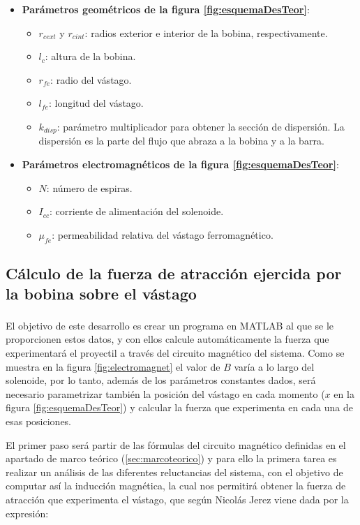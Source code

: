\begin{itemize}
    \item \textbf{Parámetros geométricos de la figura \ref{fig:esquemaDesTeor}}:
    \begin{itemize}
        \item \(r_{cext}\) y \(r_{cint} \): radios exterior e interior de la bobina, respectivamente.
        \item \(l_c\): altura de la bobina.
        \item \(r_{fe}\): radio del vástago.
        \item \(l_{fe}\): longitud del vástago.
        \item \(k_{disp}\): parámetro multiplicador para obtener la sección de dispersión. La dispersión es la parte del flujo que abraza a la bobina y a la barra.
    \end{itemize}
    \item \textbf{Parámetros electromagnéticos de la figura \ref{fig:esquemaDesTeor}}:
    \begin{itemize}
        \item \(N\): número de espiras.
        \item \(I_{cc}\): corriente de alimentación del solenoide.
        \item \(\mu_{fe}\): permeabilidad relativa del vástago ferromagnético.
    \end{itemize}
\end{itemize}

\subsection{Cálculo de la fuerza de atracción ejercida por la bobina sobre el vástago}

El objetivo de este desarrollo es crear un programa en MATLAB\textsuperscript{\textregistered} al que se le proporcionen estos datos, y con ellos calcule automáticamente la fuerza que experimentará el proyectil a través del circuito magnético del sistema. Como se muestra en la figura \ref{fig:electromagnet} el valor de \(B\) varía a lo largo del solenoide, por lo tanto, además de los parámetros constantes dados, será necesario parametrizar también la posición del vástago en cada momento (\(x\) en la figura \ref{fig:esquemaDesTeor}) y calcular la fuerza que experimenta en cada una de esas posiciones.

El primer paso será partir de las fórmulas del circuito magnético definidas en el apartado de marco teórico (\ref{sec:marcoteorico}) y para ello la primera tarea es realizar un análisis de las diferentes reluctancias del sistema, con el objetivo de computar así la inducción magnética, la cual nos permitirá obtener la fuerza de atracción que experimenta el vástago, que según Nicolás Jerez \citep{jerez2016resueltos} viene dada por la expresión:

